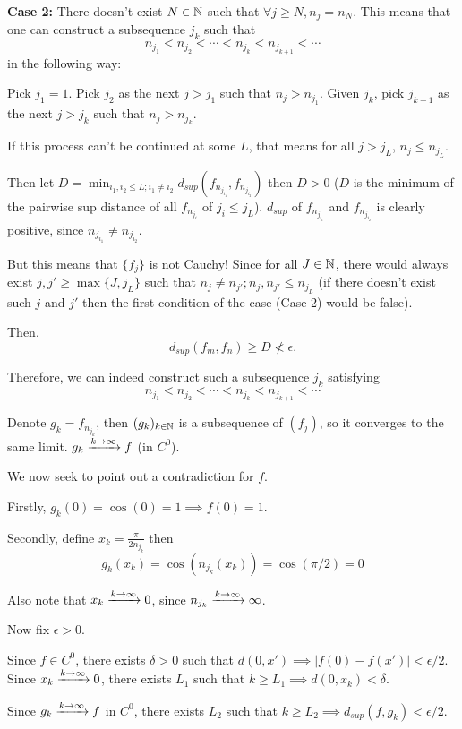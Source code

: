 \documentclass[a4paper, 12pt]{article}
\begin{document}
\begin{solution}
    \textbf{Case 2: } There doesn't exist $N \in \mathbb{N}$ such that $\forall j \geq N, n_j = n_N$. This means that one can construct a subsequence $j_k$ such that \[
        n_{j_1} < n_{j_2} < \cdots < n_{j_k} < n_{j_{k+1}} < \cdots
    \]
    in the following way:

    Pick $j_1 = 1$. Pick $j_2$ as the next $j > j_1$ such that $n_j > n_{j_1}$. Given $j_k$, pick $j_{k+1}$ as the next $j > j_{k}$ such that $n_j > n_{j_{k}}$.

    If this process can't be continued at some $L$, that means for all $j > j_{L}$, $n_j \leq n_{j_L}$.

    Then let $D = \min_{i_1, i_2 \leq L; i_1 \neq i_2} d_{sup}(f_{n_{j_{i_1}}}, f_{n_{j_{i_2}}})$ then $D > 0$ ($D$ is the minimum of the pairwise sup distance of all $f_{n_{j_i}}$ of $j_i \leq j_L$). $d_{sup}$ of $f_{n_{j_{i_1}}}$ and $f_{n_{j_{i_2}}}$ is clearly positive, since $n_{j_{i_1}} \neq n_{j_{i_2}}$.

    But this means that $\{f_j\}$ is not Cauchy! Since for all $J \in \mathbb{N}$, there would always exist $j, j' \geq \max\{J, j_L\}$ such that $n_j \neq n_{j'}; n_j, n_{j'} \leq n_{j_L}$ (if there doesn't exist such $j$ and $j'$ then the first condition of the case (Case 2) would be false).

    Then,
    \[d_{sup}(f_m, f_n) \geq D \not < \epsilon.
    \]

    Therefore, we can indeed construct such a subsequence $j_k$ satisfying
    \[
        n_{j_1} < n_{j_2} < \cdots < n_{j_k} < n_{j_{k+1}} < \cdots
    \]

    Denote $g_k = f_{n_{j_k}}$, then $(g_k)_{k \in \mathbb{N}}$ is a subsequence of $(f_j)$, so it converges to the same limit. $g_k \xrightarrow{k \to \infty} f$ (in $C^0$).

    We now seek to point out a contradiction for $f$.

    Firstly, $g_k(0) = \cos(0) = 1 \implies f(0) = 1$.

    Secondly, define $x_k = \frac{\pi}{2n_{j_k}}$ then \[
        g_k(x_k) = \cos(n_{j_k}(x_k)) = \cos(\pi/2) = 0
    \]

    Also note that $x_k \xrightarrow{k \to \infty} 0$, since $n_{j_k} \xrightarrow{k \to \infty} \infty$.

    Now fix $\epsilon > 0$.

    Since $f \in C^0$, there exists $\delta > 0$ such that $d(0, x') \implies |f(0) - f(x')| < \epsilon/2$. Since $x_k \xrightarrow{k \to \infty} 0$, there exists $L_1$ such that $k \geq L_1 \implies d(0, x_k) < \delta$.

    Since $g_k \xrightarrow{k \to \infty} f$ in $C^0$, there exists $L_2$ such that $k \geq L_2 \implies d_{sup}(f, g_k) < \epsilon /2$.


\end{solution}
\end{document}
